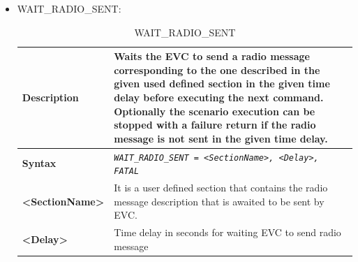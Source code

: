 \documentclass{template/openetcs}
\begin{document}
\begin{itemize}
\begin{longtable}{|l|l|l|}
			\end{longtable}
			
		\item WAIT\_RADIO\_SENT:
										
			
			
			\begin{longtable}{|l|l|l|}
				\caption{WAIT\_RADIO\_SENT}\\
				\hline
				
					\begin{minipage}[t]{0.22\linewidth} \textbf{Description} \end{minipage} 
				&	\begin{minipage}[t]{0.78\linewidth} Waits the EVC to send a radio message corresponding to the one described in the given used defined section in the given time delay before executing the next command. Optionally the scenario execution can be stopped with a failure return if the radio message is not sent in the given time delay. \end{minipage} \\
				
				\hline
								
					\begin{minipage}[t]{0.22\linewidth} \textbf{Syntax}	\end{minipage}
				&	\multicolumn{2}{l|}{ \begin{minipage}[t]{0.78\linewidth} \emph{\texttt{WAIT\_RADIO\_SENT = <SectionName>, <Delay>, FATAL}} \end{minipage} } \\
				
				\hline
				
					\begin{minipage}[t]{0.22\linewidth} \textbf{<SectionName>} \end{minipage}
				&	\multicolumn{2}{l|}{ \begin{minipage}[t]{0.78\linewidth} It is a user defined section that contains the radio message description that is awaited to be sent by EVC. \end{minipage} } \\
				
				\hline
				
					\begin{minipage}[t]{0.22\linewidth} \textbf{<Delay>} \end{minipage}
				&	\multicolumn{2}{l|}{	\begin{minipage}[t]{0.78\linewidth}	Time delay in seconds for waiting EVC to send radio message	\end{minipage} } \\
				

\end{longtable}
\end{itemize}
\end{document}
